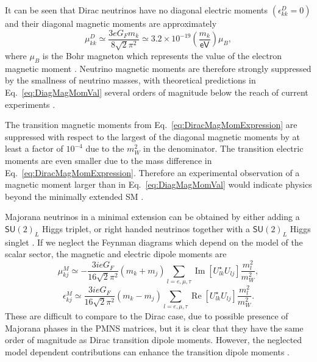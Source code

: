 It can be seen that Dirac neutrinos have no diagonal electric moments $\left(\epsilon_{kk}^D=0\right)$ and their diagonal magnetic moments are approximately
\begin{equation}\label{eq:DiagMagMomVal}
\mu_{kk}^D\simeq\frac{3eG_Fm_k}{8\sqrt{2}\pi^2}\simeq 3.2\times 10^{-19}\left(\frac{m_k}{\textsf{eV}}\right)\mu_B,
\end{equation}
where $\mu_B$ is the Bohr magneton which represents the value of the electron magnetic moment \cite{nuElmagInt2015.pdf}. Neutrino magnetic moments are therefore strongly suppressed by the smallness of neutrino masses, with theoretical predictions in Eq.~\ref{eq:DiagMagMomVal} several orders of magnitude below the reach of current experiments \cite{NeutrinoPropertiesSnowmass2022.pdf}.

The transition magnetic moments from Eq.~\ref{eq:DiracMagMomExpression} are suppressed with respect to the largest of the diagonal magnetic moments by at least a factor of $10^{-4}$ due to the $m_W^2$ in the denominator. The transition electric moments are even smaller due to the mass difference in Eq.~\ref{eq:DiracMagMomExpression}. Therefore an experimental observation of a magnetic moment larger than in Eq.~\ref{eq:DiagMagMomVal} would indicate physics beyond the minimally extended \gls{SM} \cite{nuElmagInt2015.pdf,nuMMMajoranaBounds2006.pdf}.

Majorana neutrinos in a minimal extension can be obtained by either adding a $\textsf{SU}\left(2\right)_L$ Higgs triplet, or right handed neutrinos together with a $\textsf{SU}\left(2\right)_L$ Higgs singlet \cite{nuElmagInt2015.pdf}. If we neglect the Feynman diagrams which depend on the model of the scalar sector, the magnetic and electric dipole moments are
\begin{equation}
\mu_{kj}^M\simeq -\frac{3ieG_F}{16\sqrt{2}\pi^2}\left(m_k+m_j\right)\sum_{l=e,\mu ,\tau}\operatorname{Im}\left[U^{\star}_{lk}U_{lj}\right]\frac{m_l^2}{m_W^2},
\end{equation}
\begin{equation}
\epsilon_{kj}^M\simeq \frac{3ieG_F}{16\sqrt{2}\pi^2}\left(m_k-m_j\right)\sum_{l=e,\mu ,\tau}\operatorname{Re}\left[U^{\star}_{lk}U_{lj}\right]\frac{m_l^2}{m_W^2}.
\end{equation}
These are difficult to compare to the Dirac case, due to possible presence of Majorana phases in the \gls{PMNS} matrices, but it is clear that they have the same order of magnitude as Dirac transition dipole moments. However, the neglected model dependent contributions can enhance the transition dipole moments \cite{nuElmagInt2015.pdf}.

